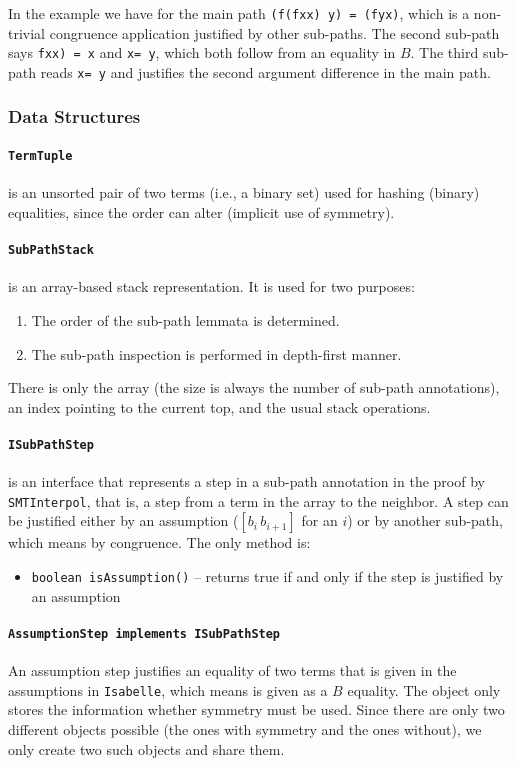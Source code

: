 \documentclass[10pt,a4paper]{article}
\newcommand{\si}{\texttt{SMTInterpol}\xspace}
\newcommand{\isa}{\texttt{Isabelle}\xspace}
\newcommand{\ttt}{\texttt}
\newcommand{\x}{\xX\xspace}
\newcommand{\y}{\yX\xspace}
\newcommand{\f}{\ttt{f}\xspace}
\newcommand{\xX}{\ttt{x}}
\newcommand{\yX}{\ttt{y}}
\begin{document}
In the example we have for the main path \ttt{(\f (\f \x \x) \y) = (\f \y \x)}, which is a non-trivial congruence application justified by other sub-paths. The second sub-path says \ttt{\f \x \x) = \x} and \ttt{\x = \y}, which both follow from an equality in $B$. The third sub-path reads \ttt{\x = \y} and justifies the second argument difference in the main path.
%
\subsubsection*{Data Structures}
\paragraph*{\ttt{TermTuple}} is an unsorted pair of two terms (i.e., a binary set) used for hashing (binary) equalities, since the order can alter (implicit use of symmetry).
%
\paragraph*{\ttt{SubPathStack}} is an array-based stack representation. It is used for two purposes:
%
\begin{enumerate}
	\item The order of the sub-path lemmata is determined.
	\item The sub-path inspection is performed in depth-first manner.
\end{enumerate}
%
There is only the array (the size is always the number of sub-path annotations), an index pointing to the current top, and the usual stack operations.
%
\paragraph*{\ttt{ISubPathStep}} is an interface that represents a step in a sub-path annotation in the proof by \si, that is, a step from a term in the array to the neighbor. A step can be justified either by an assumption ($[b_i \, b_{i+1}]$ for an $i$) or by another sub-path, which means by congruence. The only method is:
%
\begin{itemize}
	\item \ttt{boolean isAssumption()} -- returns true if and only if the step is justified by an assumption
\end{itemize}
%
\paragraph*{\ttt{AssumptionStep implements ISubPathStep}}
An assumption step justifies an equality of two terms that is given in the assumptions in \isa, which means is given as a $B$ equality. The object only stores the information whether symmetry must be used. Since there are only two different objects possible (the ones with symmetry and the ones without), we only create two such objects and share them.
%
\end{document}
